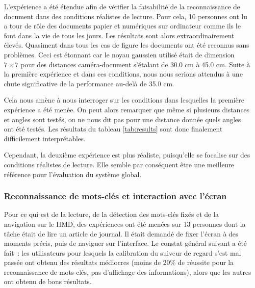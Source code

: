 \documentclass[a4paper]{article}
\begin{document}
L'expérience a été étendue afin de vérifier la faisabilité de la reconnaissance de document dans des conditions réalistes de lecture. Pour cela, 10 personnes ont lu a tour de rôle des documents papier et numériques sur ordinateur comme ils le font dans la vie de tous les jours. Les résultats sont alors extraordinairement élevés. Quasiment dans tous les cas de figure les documents ont été reconnus sans problèmes. Ceci est étonnant car le noyau gaussien utilisé était de dimension $7 \times 7$ pour des distances caméra-document s'étalant de 30.0 cm à 45.0 cm. Suite à la première expérience et dans ces conditions, nous nous serions attendus à une chute significative de la performance au-delà de 35.0 cm.

Cela nous amène à nous interroger sur les conditions dans lesquelles la première expérience a été menée. On peut alors remarquer que même si plusieurs distances et angles sont testés, on ne nous dit pas pour une distance donnée quels angles ont été testés. Les résultats du tableau \ref{tab:results} sont donc finalement difficilement interprétables.

Cependant, la deuxième expérience est plus réaliste, puisqu'elle se focalise sur des conditions réalistes de lecture. Elle semble par conséquent être une meilleure référence pour l'évaluation du système global.

\subsubsection{Reconnaissance de mots-clés et interaction avec l'écran}
Pour ce qui est de la lecture, de la détection des mots-clés fixés et de la navigation sur le HMD, des expériences ont été menées sur 13 personnes dont la tâche était de lire un article de journal. Il était demandé de fixer l'écran à des moments précis, puis de naviguer sur l'interface. Le constat général suivant a été fait~: les utilisateurs pour lesquels la calibration du suiveur de regard s'est mal passée ont obtenu des résultats médiocres (moins de 20\% de réussite pour la reconnaissance de mots-clés, pas d'affichage des informations), alors que les autres ont obtenu de bons résultats.
\end{document}
